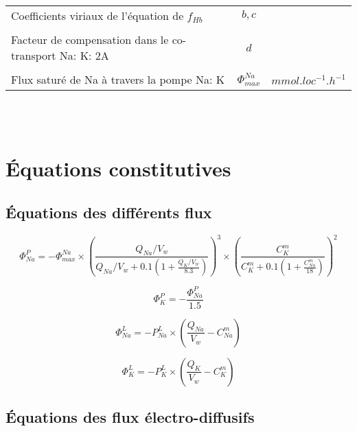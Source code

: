 \documentclass[a4paper,fleqn]{article}
\begin{document}
\begin{tabular}{p{8.4cm}cr}
Coefficients viriaux de l'équation de $f_{Hb}$                 & $b, c$                   &                     \\\\

Facteur de compensation dans le co-transport Na: K: 2A          & $d$                      &                     \\\\

Flux saturé de Na à travers la pompe Na: K                   & $\Phi_{max}^{Na}$        & $mmol.loc^{-1}.h^{-1}$ \\

\end{tabular}\\\\




\section{Équations constitutives}

\subsection{Équations des différents flux}

\begin{equation}
\Phi_{Na}^{P}={-\Phi_{max}^{Na}}\times{\left(\frac{Q_{Na}/V_w}{Q_{Na}/V_w+0.1\left(1+\frac{Q_{K}/V_w}{8.3}\right)}\right)^3}\times{\left(\frac{C_{K}^{m}}{C_{K}^{m}+0.1\left(1+\frac{C_{Na}^{m}}{18}\right)}\right)^2}
\end{equation}

\begin{equation}
\Phi_{K}^{P}=-\frac{\Phi_{Na}^{P}}{1.5}
\end{equation}

\begin{equation}
\Phi_{Na}^{L}={-P_{Na}^{L}}\times{\left(\frac{Q_{Na}}{V_w}-C_{Na}^{m}\right)}
\end{equation}

\begin{equation}
\Phi_{K}^{L}={-P_{K}^{L}}\times{\left(\frac{Q_{K}}{V_w}-C_{K}^{m}\right)}
\end{equation}

\subsection{Équations des flux électro-diffusifs}
\end{document}
